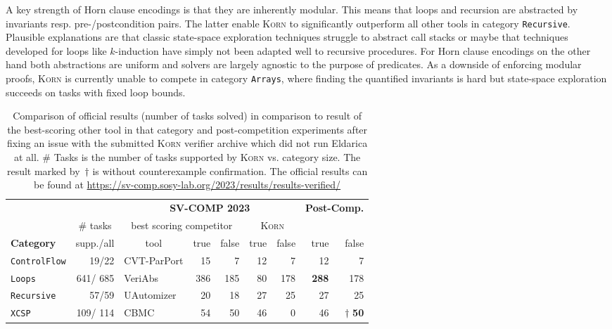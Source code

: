 \documentclass{llncs}
\newcommand{\Korn}{\textsc{Korn}\xspace}
\begin{document}
A key strength of Horn clause encodings is that they are inherently modular.
This means that loops and recursion are
abstracted by invariants resp. pre-/postcondition pairs.
The latter enable \Korn to significantly outperform all other tools in category \texttt{Recursive}.
Plausible explanations are that classic state-space exploration techniques
struggle to abstract call stacks or maybe that techniques developed for loops
like $k$-induction have simply not been adapted well to recursive procedures.
For Horn clause encodings on the other hand
both abstractions are uniform and solvers are largely agnostic to the purpose of predicates.
As a downside of enforcing modular proofs,
\Korn is currently unable to compete in category \texttt{Arrays},
where finding the quantified invariants is hard but state-space exploration succeeds
on tasks with fixed loop bounds.

\begin{table}[t]
    \setlength{\tabcolsep}{5pt}
    \centering
    \caption{Comparison of official results (number of tasks solved)
           in comparison to result of the best-scoring other tool in that category
           and post-competition experiments after fixing
           an issue with the submitted \Korn verifier archive
           which did not run Eldarica at all.
           \# Tasks is the number of tasks supported by \Korn
           vs. category size.
           The result marked by~$\dagger$ is without counterexample confirmation.
           The official results can be found at
           \url{https://sv-comp.sosy-lab.org/2023/results/results-verified/} }
    \label{fig:results}
     \begin{tabular}{lrlrrrrrr}
     \toprule
     &&
     \multicolumn{5}{c}{\textbf{SV-COMP 2023}} &
     \multicolumn{2}{c}{\textbf{Post-Comp.}} \\
     \cmidrule(lr){3-7}
     &
     \multicolumn{1}{c}{\# tasks} &
     \multicolumn{3}{c}{best scoring competitor} &
     \multicolumn{2}{c}{\Korn} &
     \\
     \cmidrule(lr){3-5}
     \cmidrule(lr){6-7}
     \cmidrule(l){8-9}
     \multicolumn{1}{l}{\textbf{Category}} &
     supp./all &
     \multicolumn{1}{c}{tool} &
     true & false &
     true & false &
     true & false \\
     \cmidrule(r){1-1}
     \cmidrule(lr){2-2}
     \cmidrule(lr){3-3}
     \cmidrule(lr){4-4}
     \cmidrule(lr){5-5}
     \cmidrule(lr){6-6}
     \cmidrule(lr){7-7}
     \cmidrule(lr){8-8}
     \cmidrule(l){9-9}
     \texttt{ControlFlow} &  19/\phantom{0}22 & CVT-ParPort & 15 & 7 &    12 &     7 &    12 &     7 \\
     \texttt{Loops}       & 641/          685 & VeriAbs         & 386 & 185 &    80 &   178 &\bf288 &   178 \\
     \texttt{Recursive}   &  57/\phantom{0}59 & UAutomizer & 20 & 18 &   27 &    25 &    27 &    25 \\
     \texttt{XCSP}        & 109/          114 & CBMC & 54 & 50 & 46 &     0 &    46 &$\dagger$ \bf 50 \\
     \bottomrule
     \end{tabular}
\end{table}
\end{document}
